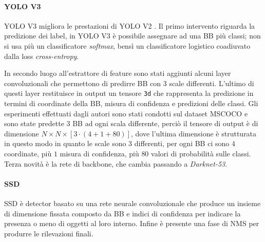 \paragraph{YOLO V3} 
\ac{YOLO} V3 migliora le prestazioni di \ac{YOLO} V2 \cite{redmon2018yolov3}. Il primo intervento riguarda la predizione dei label, in \ac{YOLO} V3 è possibile assegnare ad una \ac{BB} più classi; non si usa più un classificatore \textit{softmax}, bensì un classificatore logistico coadiuvato dalla loss \textit{cross-entropy}.

In secondo luogo all'estrattore di feature sono stati aggiunti alcuni layer convoluzionali che permettono di predirre \ac{BB} con $3$ scale differenti. L'ultimo di questi layer restituisce in output un tensore \texttt{3d} che rappresenta la predizione in termini di coordinate della \ac{BB}, misura di confidenza e predizioni delle classi. Gli esperimenti effettuati dagli autori sono stati condotti sul dataset \ac{MSCOCO} e sono state predette $3$ \ac{BB} ad ogni scala differente, perciò il tensore di output è di dimensione $N \times N \times [3 \cdot (4 + 1 + 80)]$, dove l'ultima dimensione è strutturata in questo modo in quanto le scale sono $3$ differenti, per ogni \ac{BB} ci sono $4$ coordinate, più $1$ misura di confidenza, più $80$ valori di probabilità sulle classi. 
Terza novità è la rete di backbone, che cambia passando a \textit{Darknet-53}.


\paragraph{SSD} 
\ac{SSD} \cite{liu2016ssd} è detector basato su una rete neurale convoluzionale che produce un insieme di dimensione fissata composto da \ac{BB} e indici di confidenza per indicare la presenza o meno di oggetti al loro interno. Infine è presente una fase di \ac{NMS} per produrre le rilevazioni finali. 

